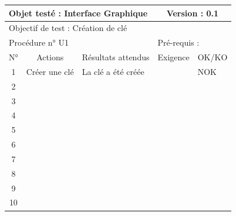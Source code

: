 \documentclass{../res/univ-projet}
\begin{document}
\begin{center}
    \begin{tabular}{|c|p{5cm}|p{5cm}|p{1.5cm}|p{1.5cm}|}
      \hline
      \multicolumn{3}{|l|}{Objet testé : Interface Graphique} & \multicolumn{2}{c|}{Version : 0.1}\\ \hline
      \multicolumn{5}{|l|}{Objectif de test : Création de clé}\\ \hline
      \multicolumn{3}{|l|}{Procédure n° U1} & \multicolumn{2}{p{3cm}|}{Pré-requis : }\\ \hline
      \multicolumn{1}{|c|}{N°} & \multicolumn{1}{c|}{Actions} & \multicolumn{1}{c|}{Résultats attendus} & 
      \multicolumn{1}{c|}{Exigence} & \multicolumn{1}{c|}{OK/KO}\\ \hline
      1 & Créer une clé & La clé a été créée &  & NOK \\
      2 &  &  &  & \\
      3 &  &  &  & \\ 
      4 &  &  &  & \\
      5 &  &  &  & \\
      6 &  &  &  & \\
      7 &  &  &  & \\
      8 &  &  &  & \\
      9 &  &  &  & \\
      10 &  &  &  &\\ 
	\hline
    \end{tabular}
    \vskip 2.2cm



\end{center}
\end{document}
